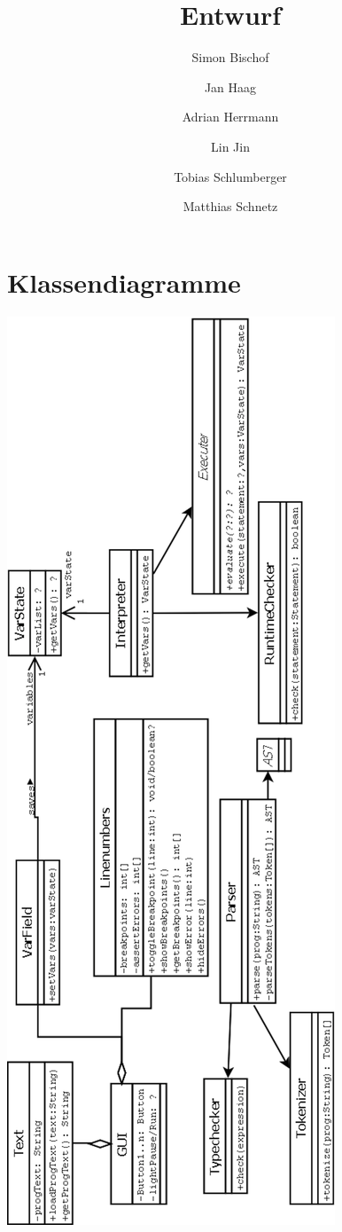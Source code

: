 \documentclass[10pt,a4paper,titlepage]{article}
\title{Entwurf}
\author{Simon Bischof \and Jan Haag \and Adrian Herrmann \and Lin Jin \and Tobias Schlumberger \and Matthias Schnetz}
\begin{document}
\maketitle
\tableofcontents
\newpage
\section{Klassendiagramme}
\newpage
\includegraphics[scale=0.45]{ClassDiagram}
\end{document}
